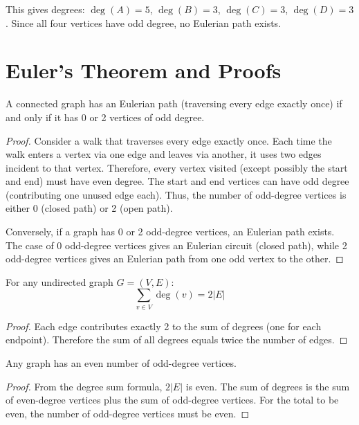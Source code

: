 This gives degrees: $\deg(A) = 5$, $\deg(B) = 3$, $\deg(C) = 3$, $\deg(D) = 3$.
Since all four vertices have odd degree, no Eulerian path exists.

\section{Euler's Theorem and Proofs}

\begin{theorem}
A connected graph has an Eulerian path (traversing every edge exactly once) if and only if
it has 0 or 2 vertices of odd degree.
\end{theorem}

\begin{proof}
Consider a walk that traverses every edge exactly once. Each time the walk enters a vertex
via one edge and leaves via another, it uses two edges incident to that vertex. Therefore,
every vertex visited (except possibly the start and end) must have even degree.
The start and end vertices can have odd degree (contributing one unused edge each).
Thus, the number of odd-degree vertices is either 0 (closed path) or 2 (open path).

Conversely, if a graph has 0 or 2 odd-degree vertices, an Eulerian path exists. The case
of 0 odd-degree vertices gives an Eulerian circuit (closed path), while 2 odd-degree vertices
gives an Eulerian path from one odd vertex to the other.
\end{proof}

\begin{theorem}
For any undirected graph $G = (V, E)$:
\[
\sum_{v \in V} \deg(v) = 2|E|
\]
\end{theorem}

\begin{proof}
Each edge contributes exactly 2 to the sum of degrees (one for each endpoint). Therefore
the sum of all degrees equals twice the number of edges.
\end{proof}

\begin{corollary}
Any graph has an even number of odd-degree vertices.
\end{corollary}

\begin{proof}
From the degree sum formula, $2|E|$ is even. The sum of degrees is the sum of even-degree
vertices plus the sum of odd-degree vertices. For the total to be even, the number of
odd-degree vertices must be even.
\end{proof}

